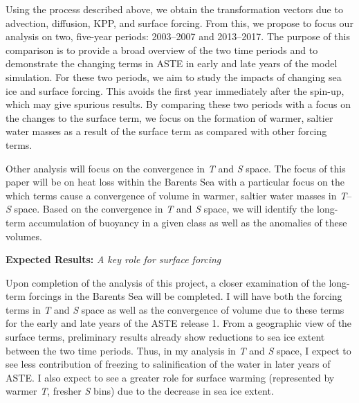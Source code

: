\documentclass[a4paper,12pt]{article}
\begin{document}
    Using the process described above, we obtain the transformation vectors due to advection, diffusion, KPP, and surface forcing. From this, we propose to focus our analysis on two, five-year periods: 2003--2007 and 2013--2017. The purpose of this comparison is to provide a broad overview of the two time periods and to demonstrate the changing terms in ASTE in early and late years of the model simulation. For these two periods, we aim to study the impacts of changing sea ice and surface forcing. This avoids the first year immediately after the spin-up, which may give spurious results. By comparing these two periods with a focus on the changes to the surface term, we focus on the formation of warmer, saltier water masses as a result of the surface term as compared with other forcing terms.

    Other analysis will focus on the convergence in \emph{T} and \emph{S} space. 
    The focus of this paper will be on heat loss within the Barents Sea with a particular focus on the which terms cause a convergence of volume in warmer, saltier water masses in \emph{T}--\emph{S} space. Based on the convergence in \emph{T} and \emph{S} space, we will identify the long-term accumulation of buoyancy in a given class as well as the anomalies of these volumes.


    \begin{tcolorbox}[minipage,colback=Goldenrod,arc=10pt,outer arc=10pt]
    \centering
    \textbf{Expected Results:}	\emph{A key role for surface forcing}\label{sec1_2}
    \end{tcolorbox}
    Upon completion of the analysis of this project, a closer examination of the long-term forcings in the Barents Sea will be completed. I will have both the forcing terms in \emph{T} and \emph{S} space as well as the convergence of volume due to these terms for the early and late years of the ASTE release 1. From a geographic view of the surface terms, preliminary results already show reductions to sea ice extent between the two time periods. Thus, in my analysis in \emph{T} and \emph{S} space, I expect to see less contribution of freezing to salinification of the water in later years of ASTE. I also expect to see a greater role for surface warming (represented by warmer \emph{T}, fresher \emph{S} bins) due to the decrease in sea ice extent.
\end{document}

